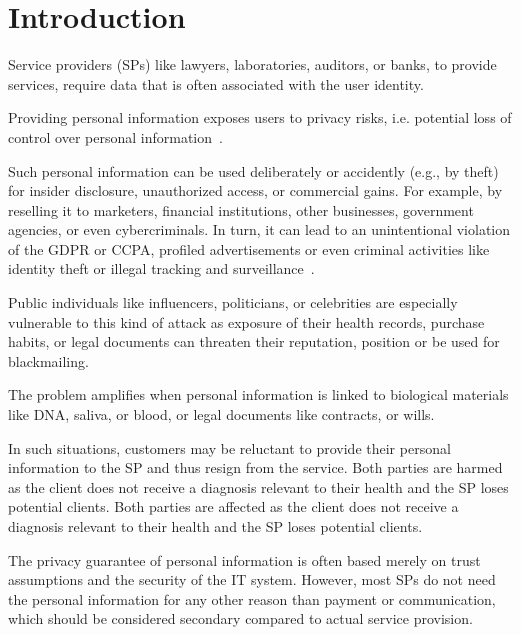 \section{Introduction}
\label{sec:introduction}
Service providers (SPs) like lawyers, laboratories, auditors, or banks, to provide services, require data that is often associated with the user identity.

Providing personal information exposes users to privacy risks, i.e. potential loss of control over personal information~\cite{smithInformationPrivacyResearch2011}.

Such personal information can be used deliberately or accidently (e.g., by theft) 
for insider disclosure, unauthorized access, or commercial gains. For example, by reselling it to marketers, financial institutions, other businesses, government agencies, or even cybercriminals. 
In turn, it can lead to an unintentional violation of the GDPR or CCPA, profiled advertisements or even criminal activities like identity theft or illegal tracking and surveillance~\cite{smithInformationPrivacyResearch2011}.

Public individuals like influencers, politicians, or celebrities are especially vulnerable to this kind of attack as exposure of their health records, purchase habits, or legal documents can threaten their reputation, position or be used for blackmailing.

The problem amplifies when personal information is linked to biological materials like DNA, saliva, or blood, or legal documents like contracts, or wills. 

In such situations, customers may be reluctant to provide their personal information to the SP and thus resign from the service. Both parties are harmed as the client does not receive a diagnosis relevant to their health and the SP loses potential clients. Both parties are affected as the client does not receive a diagnosis relevant to their health and the SP loses potential clients.

The privacy guarantee of personal information is often based merely on trust assumptions and the security of the IT system. However, most SPs do not need the personal information for any other reason than payment or communication, which should be considered secondary compared to actual service provision.

